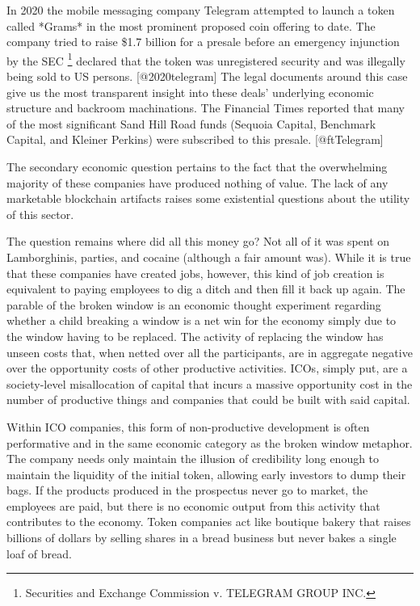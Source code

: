 In 2020 the mobile messaging company Telegram attempted to launch a token called
*Grams* in the most prominent proposed coin offering to date. The company tried
to raise \$1.7 billion for a presale before an emergency injunction by the SEC
\footnote{Securities and Exchange Commission v. TELEGRAM GROUP INC.} declared
that the token was unregistered security and was illegally being sold to US
persons. [@2020telegram] The legal documents around this case give us the most
transparent insight into these deals' underlying economic structure and backroom
machinations. The Financial Times reported that many of the most significant
Sand Hill Road funds (Sequoia Capital, Benchmark Capital, and Kleiner Perkins)
were subscribed to this presale. [@ftTelegram]
\cite{ftTelegram}


The secondary economic question pertains to the fact that the overwhelming
majority of these companies have produced nothing of value. The lack of any
marketable blockchain artifacts raises some existential questions about the
utility of this sector.

The question remains where did all this money go? Not all of it was spent on
Lamborghinis, parties, and cocaine (although a fair amount was). While it is
true that these companies have created jobs, however, this kind of job creation
is equivalent to paying employees to dig a ditch and then fill it back up again.
The parable of the broken window is an economic thought experiment regarding
whether a child breaking a window is a net win for the economy simply due to the
window having to be replaced. The activity of replacing the window has unseen
costs that, when netted over all the participants, are in aggregate negative
over the opportunity costs of other productive activities. ICOs, simply put, are
a society-level misallocation of capital that incurs a massive opportunity cost
in the number of productive things and companies that could be built with said
capital.


Within ICO companies, this form of non-productive development is often
performative and in the same economic category as the broken window metaphor.
The company needs only maintain the illusion of credibility long enough to
maintain the liquidity of the initial token, allowing early investors to dump
their bags. If the products produced in the prospectus never go to market, the
employees are paid, but there is no economic output from this activity that
contributes to the economy. Token companies act like boutique bakery that raises
billions of dollars by selling shares in a bread business but never bakes a
single loaf of bread.


